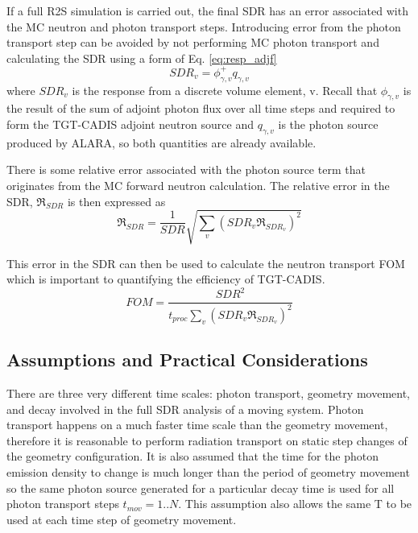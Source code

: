 If a full R2S simulation is carried out, the final SDR has an error associated
with the MC neutron and photon transport steps.  Introducing error from the photon transport
step can be avoided by not performing MC photon transport and calculating the
SDR using a form of Eq. \ref{eq:resp_adjf}
\begin{equation}\label{eq:resp_v}
	SDR_v = \phi_{\gamma, v}^{+} q_{\gamma, v}
\end{equation}
where $SDR_v$ is the response from a discrete volume element, v.
Recall that $\phi_{\gamma, v}$ is the result of the sum of adjoint photon flux 
over all time steps and required to form the TGT-CADIS adjoint neutron source
and $q_{\gamma, v}$ is the photon source produced by ALARA, so both quantities
are already available.

There is some relative error associated with the photon source term that
originates from the MC forward neutron calculation.  
The relative error in the
SDR, $\Re_{SDR}$ is then expressed as 
\begin{equation}\label{eq:err}
	\Re_{SDR} = \frac{1}{SDR} \sqrt{\sum_v{(SDR_v \Re_{SDR_v})^2}}
\end{equation}

This error in the SDR can then be used to calculate the neutron transport
FOM \cite{eb_prelim}
which is important to quantifying the efficiency of TGT-CADIS.
\begin{equation}\label{eq:fom}
	FOM = \frac{SDR^2}{t_{proc}\sum_v{(SDR_v \Re_{SDR_v})^2}}
\end{equation}




\subsection{Assumptions and Practical Considerations}
There are three very different time scales: photon transport,
geometry movement, and decay involved in the full SDR analysis of a moving
system.  Photon transport happens on a much
faster time scale than the geometry movement, therefore it is reasonable to
perform radiation transport on static step changes of the geometry
configuration.  It is also assumed that the
time for the photon emission density to change is much longer than the
period of geometry movement%
so the same photon source generated for a particular decay time
is used for all photon transport steps $t_{mov} = 1..N$.
This assumption also allows the same T to be used at each time step of geometry movement.

